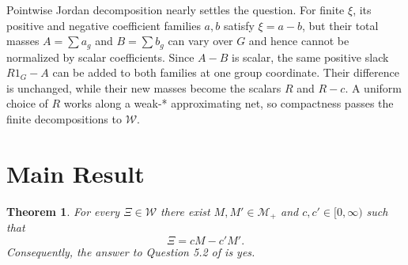 \documentclass[11pt]{article}
\newtheorem{theorem}{Theorem}
\newcommand{\W}{\mathcal W}
\newcommand{\M}{\mathcal M}
\begin{document}
Pointwise Jordan decomposition nearly settles the question.  For finite
$\xi$, its positive and negative coefficient families $a,b$ satisfy
$\xi=a-b$, but their total masses $A=\sum a_g$ and $B=\sum b_g$ can vary
over $G$ and hence cannot be normalized by scalar coefficients.  Since
$A-B$ is scalar, the same positive slack $R1_G-A$ can be added to both
families at one group coordinate.  Their difference is unchanged, while
their new masses become the scalars $R$ and $R-c$.  A uniform choice of $R$
works along a weak-* approximating net, so compactness passes the finite
decompositions to $\W$.

\section*{Main Result}

\begin{theorem}\label{thm:main}
For every $\Xi\in\W$ there exist $M,M'\in\M_+$ and
$c,c'\in[0,\infty)$ such that
\[
 \Xi=cM-c'M'.
\]
Consequently, the answer to Question 5.2 of \cite{DN} is yes.
\end{theorem}
\end{document}
